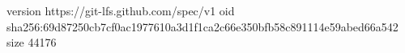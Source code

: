 version https://git-lfs.github.com/spec/v1
oid sha256:69d87250cb7cf0ac1977610a3d1f1ca2c66e350bfb58c891114e59abed66a542
size 44176
